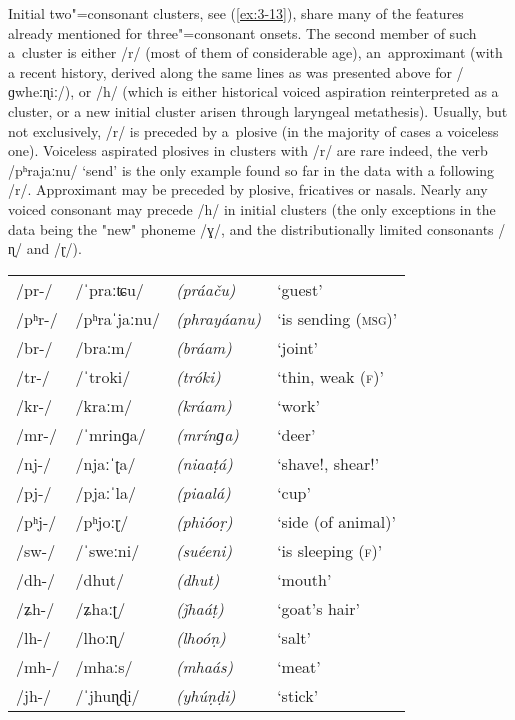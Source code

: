 Initial two"=consonant clusters, see (\ref{ex:3-13}), share many of the features already mentioned for three"=consonant onsets. The second member of such a~cluster is either /r/ (most of them of considerable age), an~approximant (with a recent history, derived along the same lines as was presented above for /ɡwheːɳiː/), or /h/ (which is either historical voiced aspiration reinterpreted as a cluster, or a new initial cluster arisen through laryngeal metathesis). Usually, but not exclusively, /r/ is preceded by a~plosive (in the majority of cases a voiceless one). Voiceless aspirated plosives in clusters with /r/ are rare indeed, the verb /pʰrajaːnu/ `send' is the only example found so far in the data with a following /r/. Approximant may be preceded by plosive, fricatives or nasals. Nearly any voiced consonant may precede /h/ in initial clusters (the only exceptions in the data being the "new" phoneme /ɣ/, and the distributionally limited consonants /ɳ/ and /ɽ/).


\begin{exe}
\extab
\label{ex:3-13}
\begin{tabular}{ l l l l }
/pr-/ &
/ˈpraːʨu/ &
\textit{(práaču)} &
`guest'\\
/pʰr-/ &
/pʰraˈjaːnu/ &
\textit{(phrayáanu)} &
`is sending (\textsc{msg)}'\\
/br-/ &
/braːm/ &
\textit{(bráam)} &
`joint'\\
/tr-/ &
/ˈtroki/ &
\textit{(tróki)} &
`thin, weak (\textsc{f)}'\\
/kr-/ &
/kraːm/ &
\textit{(kráam)} &
`work' \\
/mr-/ &
/ˈmrinɡa/ &
\textit{(mrínɡa)} &
`deer'\\
/nj-/ &
/njaːˈʈa/ &
\textit{(niaaṭá)} &
`shave!, shear!' \\
/pj-/ &
/pjaːˈla/ &
\textit{(piaalá)} &
`cup'\\
/pʰj-/ &
/pʰjoːɽ/ &
\textit{(phióoṛ)} &
`side (of animal)' \\
/sw-/ &
/ˈsweːni/ &
\textit{(suéeni) } &
`is sleeping (\textsc{f)}'\\
/dh-/ &
/dhut/ &
\textit{(dhut)} &
`mouth'\\
/ʑh-/ &
/ʑhaːʈ/ &
\textit{(ǰhaáṭ)} &
`goat's hair'\\
/lh-/ &
/lhoːɳ/ &
\textit{(lhoóṇ) } &
`salt'\\
/mh-/ &
/mhaːs/ &
\textit{(mhaás)} &
`meat'\\
/jh-/ &
/ˈjhuɳɖi/ &
\textit{(yhúṇḍi)} &
`stick'\\
\end{tabular}
\end{exe}


